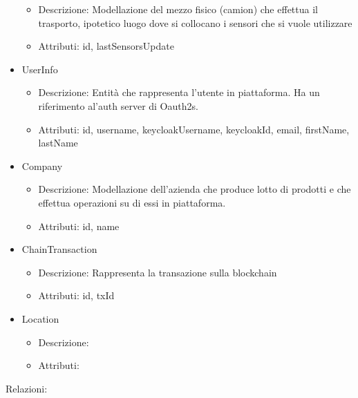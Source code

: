\documentclass[a4paper,11pt]{article}
\begin{document}
\begin{itemize}
        \begin{itemize}
          \item Descrizione: Modellazione del mezzo fisico (camion) che effettua il trasporto, ipotetico luogo dove si collocano i sensori che si vuole utilizzare
          \item Attributi: id, lastSensorsUpdate
        \end{itemize}
  \item UserInfo
        \begin{itemize}
          \item Descrizione: Entità che rappresenta l'utente in piattaforma. Ha un riferimento al'auth server di Oauth2s.
          \item Attributi: id, username, keycloakUsername, keycloakId, email, firstName, lastName
        \end{itemize}
  \item Company
        \begin{itemize}
          \item Descrizione: Modellazione dell'azienda che produce lotto di prodotti e che effettua operazioni su di essi in piattaforma.
          \item Attributi: id, name
        \end{itemize}
  \item ChainTransaction
        \begin{itemize}
          \item Descrizione: Rappresenta la transazione sulla blockchain
          \item Attributi: id, txId
        \end{itemize}
  \item Location
        \begin{itemize}
          \item Descrizione:
          \item Attributi:
        \end{itemize}
\end{itemize}

Relazioni:
\end{document}

